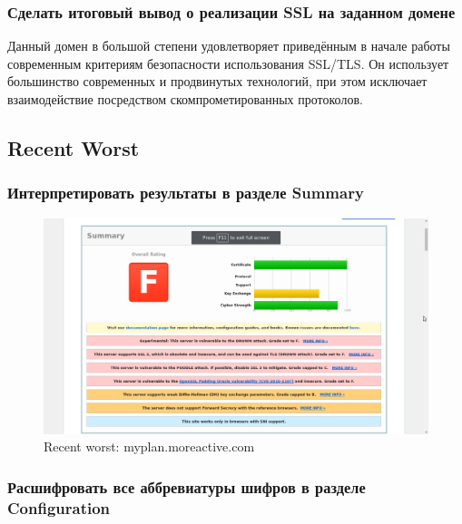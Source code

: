 \documentclass[a4paper]{article}
\begin{document}
\subsubsection{Сделать итоговый вывод о реализации SSL на заданном домене}

Данный домен в большой степени удовлетворяет приведённым в начале работы современным критериям безопасности использования SSL/TLS. Он использует большинство современных и продвинутых технологий, при этом исключает взаимодействие посредством скомпрометированных протоколов.

\subsection{Recent Worst}

\subsubsection{Интерпретировать результаты в разделе Summary}

\begin{figure}[H]
	\begin{center}
		\includegraphics[scale=0.4]{pics/worst.myplan.moreactive.com.png}
		\caption{Recent worst: myplan.moreactive.com} 
		\label{pic:pic_name}
	\end{center}
\end{figure}

\subsubsection{Расшифровать все аббревиатуры шифров в разделе Configuration}
\end{document}
